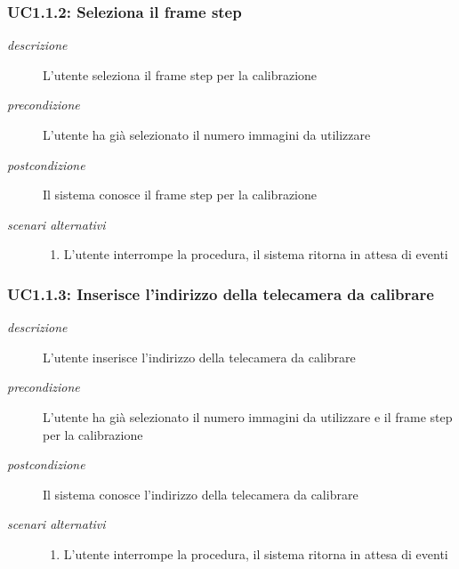 \subsubsection{UC1.1.2: Seleziona il frame step} \label{sec:UC1.1.2}
\begin{description}
\item[\em{descrizione }]L'utente seleziona il frame step per la calibrazione
\item[\em{precondizione }] L'utente ha già selezionato il numero immagini da utilizzare
\item[\em{postcondizione }] Il sistema conosce il frame step per la calibrazione
\item[\em{scenari alternativi }] \mbox{}

  \begin{enumerate}
\item L'utente interrompe la procedura, il sistema ritorna in attesa di eventi
\end{enumerate}
\end{description}

\subsubsection{UC1.1.3: Inserisce l'indirizzo della telecamera da calibrare} \label{sec:UC1.1.3}
\begin{description}
\item[\em{descrizione }]L'utente inserisce l'indirizzo della telecamera da calibrare
\item[\em{precondizione }] L'utente ha già selezionato il numero immagini da utilizzare e il frame step per la calibrazione
\item[\em{postcondizione }] Il sistema conosce l'indirizzo della telecamera da calibrare
\item[\em{scenari alternativi }] \mbox{}

  \begin{enumerate}
\item L'utente interrompe la procedura, il sistema ritorna in attesa di eventi
\end{enumerate}
\end{description}

